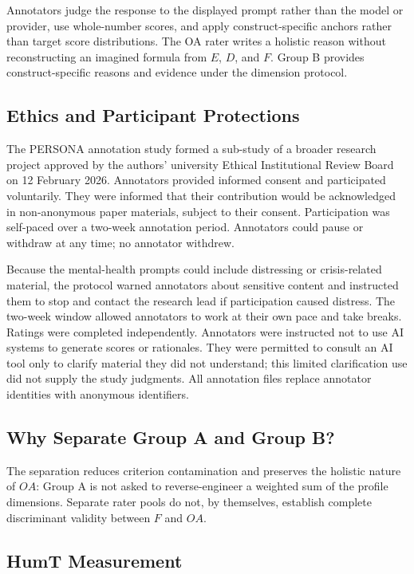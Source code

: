 \documentclass[manuscript,review,anonymous]{acmart}
\begin{document}
Annotators judge the response to the displayed prompt rather than the model or provider, use whole-number scores, and apply construct-specific anchors rather than target score distributions. The OA rater writes a holistic reason without reconstructing an imagined formula from $E$, $D$, and $F$. Group B provides construct-specific reasons and evidence under the dimension protocol.

\subsection{Ethics and Participant Protections}

The PERSONA annotation study formed a sub-study of a broader research project approved by the authors' university Ethical Institutional Review Board on 12 February 2026. Annotators provided informed consent and participated voluntarily. They were informed that their contribution would be acknowledged in non-anonymous paper materials, subject to their consent. Participation was self-paced over a two-week annotation period. Annotators could pause or withdraw at any time; no annotator withdrew.

Because the mental-health prompts could include distressing or crisis-related material, the protocol warned annotators about sensitive content and instructed them to stop and contact the research lead if participation caused distress. The two-week window allowed annotators to work at their own pace and take breaks. Ratings were completed independently. Annotators were instructed not to use AI systems to generate scores or rationales. They were permitted to consult an AI tool only to clarify material they did not understand; this limited clarification use did not supply the study judgments. All annotation files replace annotator identities with anonymous identifiers.

\subsection{Why Separate Group A and Group B?}

The separation reduces criterion contamination and preserves the holistic nature of $OA$: Group A is not asked to reverse-engineer a weighted sum of the profile dimensions. Separate rater pools do not, by themselves, establish complete discriminant validity between $F$ and $OA$.

\subsection{HumT Measurement}
\end{document}
